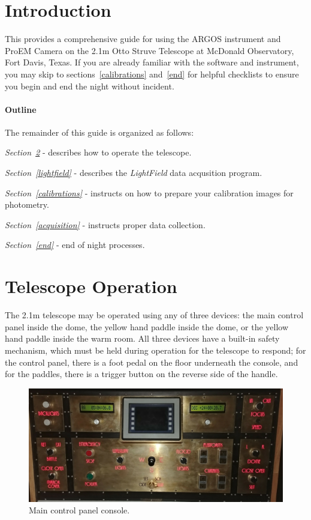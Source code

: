 \documentclass[12pt]{article}
\begin{document}
\maketitle

\section{Introduction}
This provides a comprehensive guide for using the ARGOS instrument and ProEM Camera on the 2.1m Otto Struve Telescope at McDonald Observatory, Fort Davis, Texas. If you are already familiar with the software and instrument, you may skip to sections~\ref{calibrations} and~\ref{end} for helpful checklists to ensure you begin and end the night without incident.

\paragraph{Outline}
The remainder of this guide is organized as follows:\par
\textit{Section~\ref{telescope operation}} - describes how to operate the telescope.\par
\textit{Section~\ref{lightfield}} - describes the \textit{LightField} data acqusition program.\par
\textit{Section~\ref{calibrations}} - instructs on how to prepare your calibration images for photometry.\par
\textit{Section~\ref{acquisition}} - instructs proper data collection.\par
\textit{Section~\ref{end}} - end of night processes.

\section{Telescope Operation}\label{telescope operation}
The 2.1m telescope may be operated using any of three devices: the main control panel inside the dome, the yellow hand paddle inside the dome, or the yellow hand paddle inside the warm room. All three devices have a built-in safety mechanism, which must be held during operation for the telescope to respond; for the control panel, there is a foot pedal on the floor underneath the console, and for the paddles, there is a trigger button on the reverse side of the handle.\par

\begin{figure}[t]
   \centering
   \includegraphics[width=\textwidth]{console.jpg}
   \caption{Main control panel console.\label{fig:console}}
\end{figure}
\end{document}
